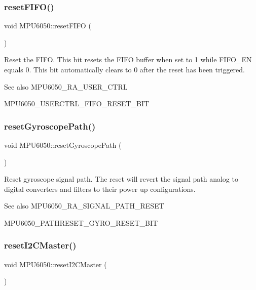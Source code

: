 \subsubsection{\texorpdfstring{resetFIFO()}{resetFIFO()}}
{\footnotesize\ttfamily void M\+P\+U6050\+::reset\+F\+I\+FO (\begin{DoxyParamCaption}{ }\end{DoxyParamCaption})}

Reset the F\+I\+FO. This bit resets the F\+I\+FO buffer when set to 1 while F\+I\+F\+O\+\_\+\+EN equals 0. This bit automatically clears to 0 after the reset has been triggered. \begin{DoxySeeAlso}{See also}
M\+P\+U6050\+\_\+\+R\+A\+\_\+\+U\+S\+E\+R\+\_\+\+C\+T\+RL 

M\+P\+U6050\+\_\+\+U\+S\+E\+R\+C\+T\+R\+L\+\_\+\+F\+I\+F\+O\+\_\+\+R\+E\+S\+E\+T\+\_\+\+B\+IT 
\end{DoxySeeAlso}
\mbox{\label{class_m_p_u6050_af1599c0d70f07fd3e28683d571842c22}} 
\subsubsection{\texorpdfstring{resetGyroscopePath()}{resetGyroscopePath()}}
{\footnotesize\ttfamily void M\+P\+U6050\+::reset\+Gyroscope\+Path (\begin{DoxyParamCaption}{ }\end{DoxyParamCaption})}

Reset gyroscope signal path. The reset will revert the signal path analog to digital converters and filters to their power up configurations. \begin{DoxySeeAlso}{See also}
M\+P\+U6050\+\_\+\+R\+A\+\_\+\+S\+I\+G\+N\+A\+L\+\_\+\+P\+A\+T\+H\+\_\+\+R\+E\+S\+ET 

M\+P\+U6050\+\_\+\+P\+A\+T\+H\+R\+E\+S\+E\+T\+\_\+\+G\+Y\+R\+O\+\_\+\+R\+E\+S\+E\+T\+\_\+\+B\+IT 
\end{DoxySeeAlso}
\mbox{\label{class_m_p_u6050_a96332c394f1b7efd44c83a4ff690e732}} 
\subsubsection{\texorpdfstring{resetI2CMaster()}{resetI2CMaster()}}
{\footnotesize\ttfamily void M\+P\+U6050\+::reset\+I2\+C\+Master (\begin{DoxyParamCaption}{ }\end{DoxyParamCaption})}

